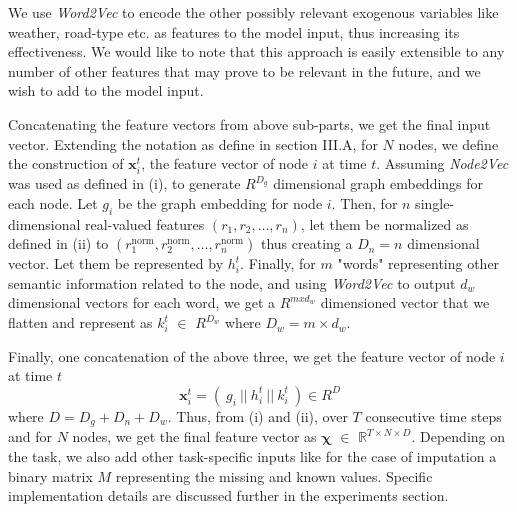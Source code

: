 We use \textit{Word2Vec} to encode the other possibly relevant exogenous variables like weather, road-type etc. as features to the model input, thus increasing its effectiveness. We would like to note that this approach is easily extensible to any number of other features that may prove to be relevant in the future, and we wish to add to the model input.

\vspace{3ex} Concatenating the feature vectors from above sub-parts, we get the final input vector. Extending the notation as define in section III.A, for \(N\) nodes, we define the construction of \(\mathbf{x}_i^t\), the feature vector of node \(i\) at time \(t\). Assuming \textit{Node2Vec} was used as defined in (i), to generate \(R^{D_g}\) dimensional graph embeddings for each node. Let \(g_i\) be the graph embedding for node \(i\). Then, for \(n\) single-dimensional real-valued features \((r_1, r_2, \ldots, r_n)\), let them be normalized as defined in (ii) to \((r_1^{\text{norm}}, r_2^{\text{norm}}, \ldots, r_n^{\text{norm}})\) thus creating a \(D_n = n\) dimensional vector. Let them be represented by \(h_i^t\). Finally, for \(m\) "words" representing other semantic information related to the node, and using \textit{Word2Vec} to output \(d_w\) dimensional vectors for each word, we get a \(R^{mxd_w}\) dimensioned vector that we flatten and represent as \(k_i^t\) \(\in\) \(R^{D_w}\) where \(D_w = m \times d_w\).

Finally, one concatenation of the above three, we get the feature vector of node \(i\) at time \(t\) 
\[\mathbf{x}_i^t = (\ g_i\ ||\ h_i^t\ ||\ k_i^t\ ) \in R^D\] 
where \(D = D_g+D_n+D_w\).
Thus, from (i) and (ii), over \( T \) consecutive time steps and for \( N \) nodes, we get the final feature vector as \( \mathbf{\chi} \)  \(\in\) \( \mathbb{R}^{T \times N \times D} \).
Depending on the task, we also add other task-specific inputs like for the case of imputation a binary matrix \( M \) representing the missing and known values. Specific implementation details are discussed further in the experiments section.
